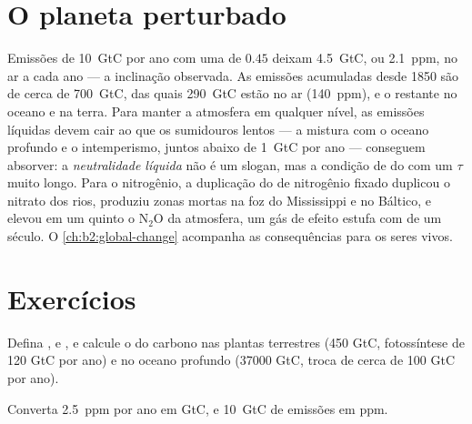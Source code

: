 \section{O planeta perturbado}

\begin{example}\label{ex:b2:biogeochemical-cycles:numbers}
Emissões de \qty{10}{GtC} por ano com uma  de
$0.45$ deixam \qty{4.5}{GtC}, ou \qty{2.1}{ppm}, no ar a cada ano ---
a inclinação observada. As emissões acumuladas desde 1850 são de cerca
de \qty{700}{GtC}, das quais \qty{290}{GtC} estão no ar (140~ppm), e o
restante no oceano e na terra. Para manter a atmosfera em qualquer
nível, as emissões líquidas devem cair ao que os sumidouros lentos ---
a mistura com o oceano profundo e o intemperismo, juntos abaixo de
\qty{1}{GtC} por ano --- conseguem absorver: a \emph{neutralidade
líquida} não é um slogan, mas a condição de  do
 com um $\tau$ muito longo. Para o nitrogênio, a
duplicação do  de nitrogênio fixado duplicou o nitrato dos rios,
produziu zonas mortas na foz do Mississippi e no Báltico, e elevou em um
quinto o $\mathrm{N_2O}$ da atmosfera, um gás de efeito estufa com  de um século. O \cref{ch:b2:global-change} acompanha as
consequências para os seres vivos.
\end{example}

\section{Exercícios}

\begin{exercise}[$\star$]\label{exo:b2:biogeochemical-cycles:1}
Defina ,  e , e calcule o  do carbono nas plantas terrestres (450 GtC, fotossíntese de
120 GtC por ano) e no oceano profundo (\num{37000} GtC, troca de cerca
de 100 GtC por ano).
\end{exercise}

\begin{exercise}[$\star$]\label{exo:b2:biogeochemical-cycles:2}
Converta \qty{2.5}{ppm} por ano em GtC, e \qty{10}{GtC} de emissões
em ppm.
\end{exercise}

